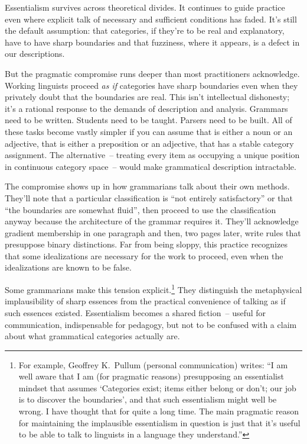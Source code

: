 Essentialism survives across theoretical divides. It continues to guide practice even where explicit talk of necessary and sufficient conditions has faded. It's still the default assumption: that categories, if they're to be real and explanatory, have to have sharp boundaries and that fuzziness, where it appears, is a defect in our descriptions.

But the pragmatic compromise runs deeper than most practitioners acknowledge. Working linguists proceed \emph{as if} categories have sharp boundaries even when they privately doubt that the boundaries are real. This isn't intellectual dishonesty; it's a rational response to the demands of description and analysis. Grammars need to be written. Students need to be taught. Parsers need to be built. All of these tasks become vastly simpler if you can assume that  is either a noun or an adjective, that  is either a preposition or an adjective, that  has a stable category assignment. The alternative~-- treating every item as occupying a unique position in continuous category space~-- would make grammatical description intractable.

The compromise shows up in how grammarians talk about their own methods. They'll note that a particular classification is \enquote{not entirely satisfactory} or that \enquote{the boundaries are somewhat fluid}, then proceed to use the classification anyway because the architecture of the grammar requires it. They'll acknowledge gradient membership in one paragraph and then, two pages later, write rules that presuppose binary distinctions. Far from being sloppy, this practice recognizes that some idealizations are necessary for the work to proceed, even when the idealizations are known to be false.

Some grammarians make this tension explicit.\footnote{For example, Geoffrey K.\ Pullum (personal communication) writes: \enquote{I am well aware that I am (for pragmatic reasons) presupposing an essentialist mindset that assumes \enquote{Categories exist; items either belong or don't; our job is to discover the boundaries}, and that such essentialism might well be wrong. I have thought that for quite a long time. The main pragmatic reason for maintaining the implausible essentialism in question is just that it's useful to be able to talk to linguists in a language they understand.}} They distinguish the metaphysical implausibility of sharp essences from the practical convenience of talking as if such essences existed. Essentialism becomes a shared fiction~-- useful for communication, indispensable for pedagogy, but not to be confused with a claim about what grammatical categories actually are.

